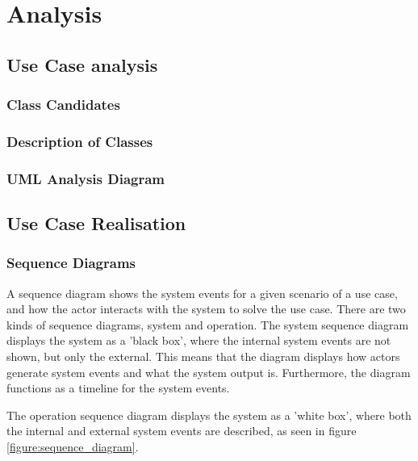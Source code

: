 \section{Analysis}

\subsection{Use Case analysis}

\subsubsection{Class Candidates}

\subsubsection{Description of Classes}

\subsubsection{UML Analysis Diagram}

\subsection{Use Case Realisation}

\subsubsection{Sequence Diagrams}
A sequence diagram shows the system events for a given scenario of a use case,
and how the actor interacts with the system to solve the use case. There are two
kinds of sequence diagrams, system and operation. The system sequence diagram
displays the system as a 'black box', where the internal system events are not
shown, but only the external. This means that the diagram displays how actors
generate system events and what the system output is. Furthermore, the diagram
functions as a timeline for the system events. \\


The operation sequence diagram displays the system as a 'white box', where both
the internal and external system events are described, as seen in figure
\ref{figure:sequence_diagram}.

